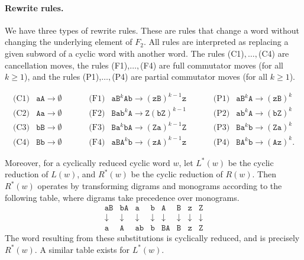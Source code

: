 \documentclass{article}
\begin{document}
	\paragraph{Rewrite rules.}
	We have three types of rewrite rules.
	These are rules that change a word without changing the underlying element of $F_2$.
	All rules are interpreted as replacing a given subword of a cyclic word with another word. The rules (C1)$,\hdots,$(C4) are cancellation moves, the rules (F1),$\hdots,$(F4) are full commutator moves (for all $k\geq 1$), and the rules (P1),$\hdots,$(P4) are partial commutator moves (for all $k\geq 1$).
	
	\[
	\begin{matrix}
		\text{(C1)} & \mathtt{aA}\to\emptyset &\hspace{20pt} & \text{(F1)} & \mathtt{aB}^k \mathtt{A b}\to (\mathtt{zB})^{k-1}\mathtt{z}&\hspace{20pt} & \text{(P1)} & \mathtt{aB}^k \mathtt{A}\to (\mathtt{zB})^k \\
		\text{(C2)} & \mathtt{Aa}\to\emptyset &\hspace{20pt} & \text{(F2)} & \mathtt{Bab}^k \mathtt{A }\to \mathtt{Z}(\mathtt{bZ})^{k-1}&\hspace{20pt} & \text{(P2)} & \mathtt{ab}^k\mathtt{A}\to (\mathtt{bZ})^k \\
		\text{(C3)} & \mathtt{bB}\to\emptyset &\hspace{20pt} & \text{(F3)} &\mathtt{Ba}^k \mathtt{bA}\to (\mathtt{Za})^{k-1}\mathtt{Z} &\hspace{20pt} & \text{(P3)} & \mathtt{Ba}^k \mathtt{b}\to (\mathtt{Z a})^k \\
		\text{(C4)} & \mathtt{Bb}\to\emptyset &\hspace{20pt} & \text{(F4)} & \mathtt{aBA}^k \mathtt{b}\to (\mathtt{zA})^{k-1}\mathtt{z}&\hspace{20pt} & \text{(P4)} & \mathtt{BA}^k \mathtt{b}\to (\mathtt{A z})^k. 
	\end{matrix}
	\]
	
	Moreover, for a cyclically reduced cyclic word $w$, let $L^*(w)$ be the cyclic reduction of $L(w)$, and $R^*(w)$ be the cyclic reduction of $R(w)$.
	Then $R^*(w)$ operates by transforming digrams and monograms according to the following table, where digrams take precedence over monograms.
	\[
	\begin{matrix}
		\mathtt{aB}&\mathtt{bA}&\mathtt{a}&\mathtt{b}&\mathtt{A}&\mathtt{B}&\mathtt{z}&\mathtt{Z}\\
		\downarrow&\downarrow&\downarrow&\downarrow&\downarrow&\downarrow&\downarrow&\downarrow\\
		\mathtt{a}&\mathtt{A}&\mathtt{ab}&\mathtt{b}&\mathtt{BA}&\mathtt{B}&\mathtt{z}&\mathtt{Z}
	\end{matrix}
	\]
	The word resulting from these substitutions is cyclically reduced, and is precisely $R^*(w)$.
	A similar table exists for $L^*(w)$.
	
\end{document}

